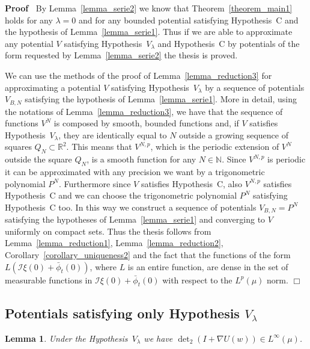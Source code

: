\documentclass[a4paper,10pt]{article}
\newenvironment{proof}{\noindent\textbf{Proof\ }}{\hspace*{\fill}$\Box$\medskip}
\newtheorem{lemma}[theorem]{Lemma}
\begin{document}
\begin{proof}
  By Lemma~\ref{lemma_serie2} we know that Theorem~\ref{theorem_main1} holds
  for any $\lambda = 0$ and for any bounded potential satisfying Hypothesis~C
  and the hypothesis of Lemma~\ref{lemma_serie1}. Thus if we are able to
  approximate any potential $V$ satisfying Hypothesis~$V_{\lambda}$ and
  Hypothesis~C by potentials of the form requested by Lemma~\ref{lemma_serie2}
  the thesis is proved.
  
  We can use the methods of the proof of Lemma~\ref{lemma_reduction3} for
  approximating a potential $V$ satisfying Hypothesis~$V_{\lambda}$ by a
  sequence of potentials $V_{B, N}$ satisfying the hypothesis of
  Lemma~\ref{lemma_serie1}. More in detail, using the notations of
  Lemma~\ref{lemma_reduction3}, we have that the sequence of functions $V^N$
  is composed by smooth, bounded functions and, if $V$ satisfies
  Hypothesis~$V_{\lambda}$, they are identically equal to $N$ outside a
  growing sequence of squares $Q_N \subset \mathbb{R}^2$. This means that
  $V^{N, p}$, which is the periodic extension of $V^N$ outside the square
  $Q_N$, is a smooth function for any $N \in \mathbb{N}$. Since $V^{N, p}$ is
  periodic it can be approximated with any precision we want by a
  trigonometric polynomial $P^N$. Furthermore since $V$ satisfies
  Hypothesis~C, also $V^{N, p}$ satisfies Hypothesis~C and we can choose the
  trigonometric polynomial $P^N$ satisfying Hypothesis~C too. In this way we
  construct a sequence of potentials $V_{B, N} = P^N$ satisfying the
  hypotheses of Lemma~\ref{lemma_serie1} and converging to $V$ uniformly on
  compact sets. Thus the thesis follows from Lemma~\ref{lemma_reduction1},
  Lemma~\ref{lemma_reduction2}, Corollary~\ref{corollary_uniqueness2} and the
  fact that the functions of the form $L (\mathcal{I} \xi (0) + \bar{\phi}_t
  (0))$, where $L$ is an entire function, are dense in the set of measurable
  functions in $\mathcal{I} \xi (0) + \bar{\phi}_t (0)$ with respect to the
  $L^p (\mu)$ norm.
\end{proof}

\subsection{Potentials satisfying only Hypothesis $V_{\lambda}$}

\begin{lemma}
  \label{theorem_det}Under the Hypothesis~$V_{\lambda}$ we have $\det_2 (I +
  \nabla U (w)) \in L^{\infty} (\mu)$.
\end{lemma}
\end{document}
